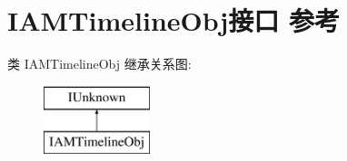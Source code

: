 \hypertarget{interface_i_a_m_timeline_obj}{}\section{I\+A\+M\+Timeline\+Obj接口 参考}
\label{interface_i_a_m_timeline_obj}
类 I\+A\+M\+Timeline\+Obj 继承关系图\+:\begin{figure}[H]
\begin{center}
\leavevmode
\includegraphics[height=2.000000cm]{interface_i_a_m_timeline_obj}
\end{center}
\end{figure}
